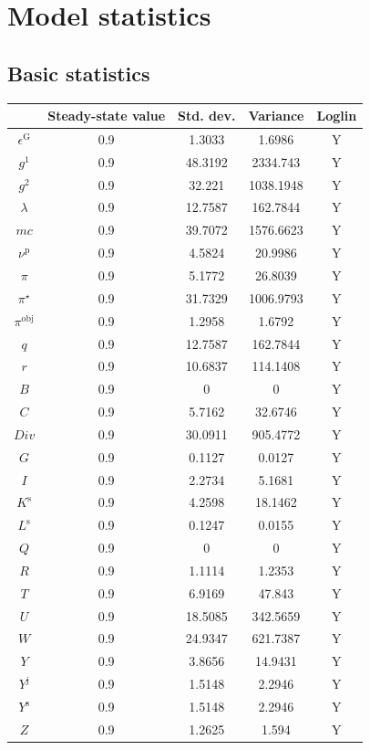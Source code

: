 \section{Model statistics}

\subsection{Basic statistics}

\begin{tabular}{c|c|c|c|c|}
  & Steady-state value & Std. dev. & Variance & Loglin\\
\hline
$\epsilon^{\mathrm{G}}$ & 0.9 & 1.3033 & 1.6986 & Y    \\
$g^{\mathrm{1}}$ & 0.9 & 48.3192 & 2334.743 & Y    \\
$g^{\mathrm{2}}$ & 0.9 & 32.221 & 1038.1948 & Y    \\
$\lambda$ & 0.9 & 12.7587 & 162.7844 & Y    \\
${m\!c}$ & 0.9 & 39.7072 & 1576.6623 & Y    \\
$\nu^{\mathrm{p}}$ & 0.9 & 4.5824 & 20.9986 & Y    \\
$\pi$ & 0.9 & 5.1772 & 26.8039 & Y    \\
$\pi^{\star}$ & 0.9 & 31.7329 & 1006.9793 & Y    \\
$\pi^{\mathrm{obj}}$ & 0.9 & 1.2958 & 1.6792 & Y    \\
$q$ & 0.9 & 12.7587 & 162.7844 & Y    \\
$r$ & 0.9 & 10.6837 & 114.1408 & Y    \\
$B$ & 0.9 & 0 & 0 & Y    \\
$C$ & 0.9 & 5.7162 & 32.6746 & Y    \\
${D\!i\!v}$ & 0.9 & 30.0911 & 905.4772 & Y    \\
$G$ & 0.9 & 0.1127 & 0.0127 & Y    \\
$I$ & 0.9 & 2.2734 & 5.1681 & Y    \\
$K^{\mathrm{s}}$ & 0.9 & 4.2598 & 18.1462 & Y    \\
$L^{\mathrm{s}}$ & 0.9 & 0.1247 & 0.0155 & Y    \\
$Q$ & 0.9 & 0 & 0 & Y    \\
$R$ & 0.9 & 1.1114 & 1.2353 & Y    \\
$T$ & 0.9 & 6.9169 & 47.843 & Y    \\
$U$ & 0.9 & 18.5085 & 342.5659 & Y    \\
$W$ & 0.9 & 24.9347 & 621.7387 & Y    \\
$Y$ & 0.9 & 3.8656 & 14.9431 & Y    \\
$Y^{\mathrm{j}}$ & 0.9 & 1.5148 & 2.2946 & Y    \\
$Y^{\mathrm{s}}$ & 0.9 & 1.5148 & 2.2946 & Y    \\
$Z$ & 0.9 & 1.2625 & 1.594 & Y    \\
\hline
\end{tabular}


